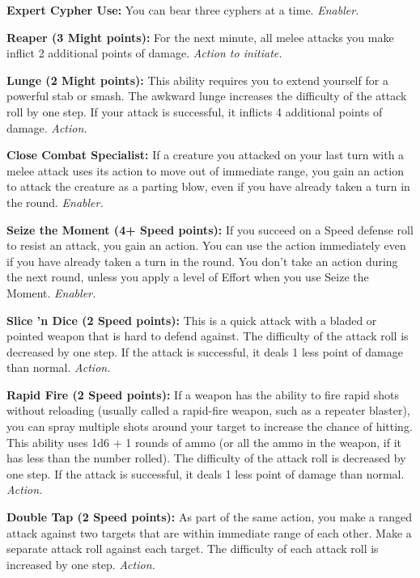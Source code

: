 \documentclass[a4paper,10pt,final,twocolumn,oneside]{book}
\newcommand{\itemAbility}[2]{\textcolor{25gray}{\textbullet\textbf{ #1:}}{ #2}\par}
\newcommand{\enabler}{\textit{ Enabler.}}
\newcommand{\action}{\textit{ Action.}}
\newcommand{\actionInit}{\textit{ Action to initiate.}}
\begin{document}
\itemAbility{Expert Cypher Use}{You can bear three cyphers at a time.\enabler}

\itemAbility{Reaper (3 Might points)}{For the next minute, all melee attacks you make inflict 2 additional points of damage.\actionInit}

\itemAbility{Lunge (2 Might points)}{This ability requires you to extend yourself for a powerful stab or smash. The awkward lunge increases the difficulty of the attack roll by one step. If your attack is successful, it inflicts 4 additional points of damage.\action}

\itemAbility{Close Combat Specialist}{If a creature you attacked on your last turn with a melee attack uses its action to move out of immediate range, you gain an action to attack the creature as a parting blow, even if you have already taken a turn in the round.\enabler}

\itemAbility{Seize the Moment (4+ Speed points)}{If you succeed on a Speed defense roll to resist an attack, you gain an action. You can use the action immediately even if you have already taken a turn in the round. You don’t take an action during the next round, unless you apply a level of Effort when you use Seize the Moment.\enabler}

\itemAbility{Slice 'n Dice (2 Speed points)}{This is a quick attack with a bladed or pointed weapon that is hard to defend against. The difficulty of the attack roll is decreased by one step. If the attack is successful, it deals 1 less point of damage than normal.\action}

\itemAbility{Rapid Fire (2 Speed points)}{If a weapon has the ability to fire rapid shots without reloading (usually called a rapid-fire weapon, such as a repeater blaster), you can spray multiple shots around your target to increase the chance of hitting. This ability uses 1d6 + 1 rounds of ammo (or all the ammo in the weapon, if it has less than the number rolled). The difficulty of the attack roll is decreased by one step. If the attack is successful, it deals 1 less point of damage than normal.\action}

\itemAbility{Double Tap (2 Speed points)}{As part of the same action, you make a ranged attack against two targets that are within immediate range of each other. Make a separate attack roll against each target. The difficulty of each attack roll is increased by one step.\action}

\end{document}
